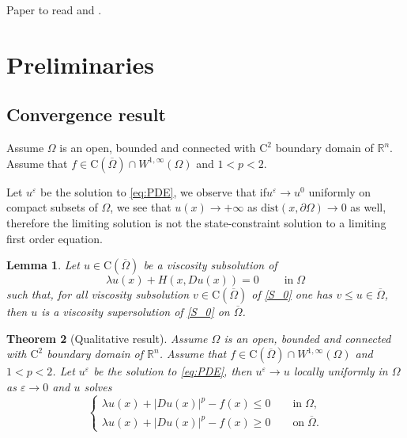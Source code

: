 \documentclass[11pt,reqno]{amsart}
\numberwithin{figure}{section}
\theoremstyle{plain}
\newtheorem{thm}{Theorem}[section]
\newtheorem{lem}[thm]{Lemma}
\theoremstyle{remark}
\numberwithin{equation}{section}
\newcommand{\rmC}{\mathrm{C}}
\begin{document}
Paper to read \cite{Ishii2017a} and \cite{Lasry1989}.

\section{Preliminaries}\label{sec:prelim}




\subsection{Convergence result}
Assume $\Omega$ is an open, bounded and connected with $\mathrm{C}^2$ boundary domain of $\mathbb{R}^n$. Assume that $f\in \mathrm{C}(\overline{\Omega})\cap W^{1,\infty}(\Omega)$ and $1<p<2$. 

Let $u^\varepsilon$ be the solution to \eqref{eq:PDE}, we observe that if$u^\varepsilon\rightarrow u^0$ uniformly on compact subsets of $\Omega$, we see that $u(x)\rightarrow +\infty$ as $\mathrm{dist}(x,\partial \Omega)\to 0$ as well, therefore the limiting solution is not the state-constraint solution to a limiting first order equation.

\begin{lem}\label{lem:max} Let $u\in \rmC(\overline{\Omega})$ be a viscosity subsolution of 
\begin{equation}\label{S_0}
 \lambda u(x) + H(x,Du(x)) = 0\;\qquad\text{in}\;\Omega
\end{equation}
such that, for all viscosity subsolution $v\in \rmC(\overline{\Omega})$ of \eqref{S_0} one has $v\leq u\in \overline{\Omega}$, then $u$ is a viscosity supersolution of \eqref{S_0} on $\overline{\Omega}$.
\end{lem}



\begin{thm}[Qualitative result] Assume $\Omega$ is an open, bounded and connected with $\mathrm{C}^2$ boundary domain of $\mathbb{R}^n$. Assume that $f\in \mathrm{C}(\overline{\Omega})\cap W^{1,\infty}(\Omega)$ and $1<p<2$. Let $u^\varepsilon$ be the solution to \eqref{eq:PDE}, then $u^\varepsilon \rightarrow u$ locally uniformly in $\Omega$ as $\varepsilon\rightarrow 0$ and $u$ solves
\begin{equation}\label{eq:PDE0}
    \begin{cases}
    \lambda u(x) + |Du(x)|^p - f(x) \leq 0 \qquad\text{in}\;\Omega,\\
    \lambda u(x) + |Du(x)|^p - f(x) \geq 0 \qquad\text{on}\;\overline{\Omega}.
    \end{cases}\tag{PDE$_0$}   
\end{equation}
\end{thm}
\end{document}
